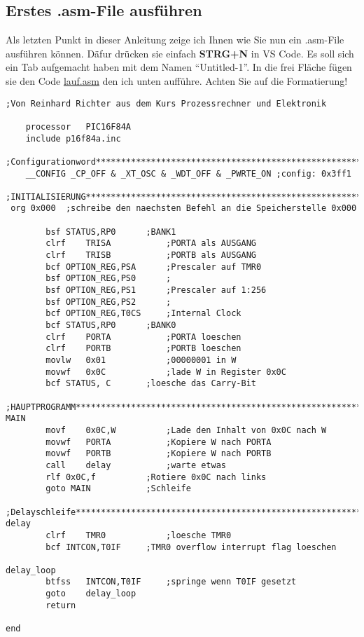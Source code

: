\subsection{Erstes .asm-File ausführen}
Als letzten Punkt in dieser Anleitung zeige ich Ihnen wie Sie nun ein {\ttfamily .asm}-File ausführen können. Däfur drücken sie einfach \textbf{STRG+N} in VS Code. Es soll sich ein Tab aufgemacht haben mit dem Namen \enquote{Untitled-1}. In die frei Fläche fügen sie den Code \href{https://github.com/ManeLippert/AssemblerVSCode/lauf.asm}{\ttfamily lauf.asm} den ich unten aufführe. Achten Sie auf die Formatierung!
\begin{lstlisting}[language={[x86masm]Assembler}]
;Von Reinhard Richter aus dem Kurs Prozessrechner und Elektronik

    processor	PIC16F84A
    include	p16f84a.inc

;Configurationword*************************************************************
    __CONFIG _CP_OFF & _XT_OSC & _WDT_OFF & _PWRTE_ON ;config: 0x3ff1

;INITIALISIERUNG***************************************************************
 org 0x000	;schreibe den naechsten Befehl an die Speicherstelle 0x000

        bsf	STATUS,RP0		;BANK1
        clrf	TRISA			;PORTA als AUSGANG
        clrf	TRISB			;PORTB als AUSGANG
        bcf	OPTION_REG,PSA		;Prescaler auf TMR0
        bsf	OPTION_REG,PS0		;
        bsf	OPTION_REG,PS1		;Prescaler auf 1:256
        bsf	OPTION_REG,PS2		;
        bcf	OPTION_REG,T0CS		;Internal Clock
        bcf	STATUS,RP0		;BANK0
        clrf	PORTA			;PORTA loeschen
        clrf	PORTB			;PORTB loeschen
        movlw	0x01			;00000001 in W
        movwf	0x0C			;lade W in Register 0x0C
        bcf	STATUS, C		;loesche das Carry-Bit

;HAUPTPROGRAMM*****************************************************************
MAIN
        movf	0x0C,W			;Lade den Inhalt von 0x0C nach W
        movwf	PORTA			;Kopiere W nach PORTA
        movwf	PORTB			;Kopiere W nach PORTB
        call	delay			;warte etwas
        rlf	0x0C,f			;Rotiere 0x0C nach links
        goto MAIN			;Schleife

;Delayschleife*****************************************************************
delay
        clrf	TMR0			;loesche TMR0
        bcf	INTCON,T0IF		;TMR0 overflow interrupt flag loeschen

delay_loop
        btfss	INTCON,T0IF		;springe wenn T0IF gesetzt
        goto	delay_loop			
        return

end
\end{lstlisting}
